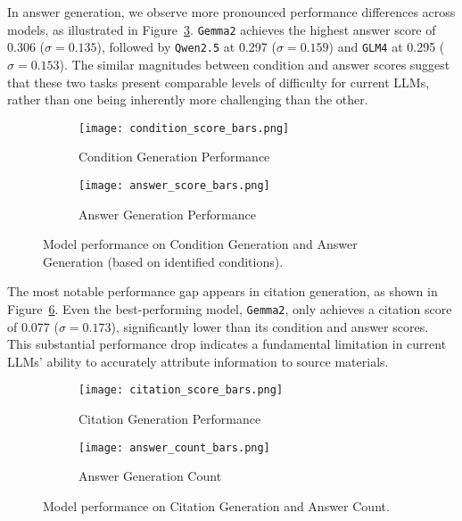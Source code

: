 In answer generation, we observe more pronounced performance differences across models, as illustrated in Figure~\ref{fig:performance-metrics-row1}. \texttt{Gemma2} achieves the highest answer score of 0.306 ($\sigma = 0.135$), followed by \texttt{Qwen2.5} at 0.297 ($\sigma = 0.159$) and \texttt{GLM4} at 0.295 ($\sigma = 0.153$). The similar magnitudes between condition and answer scores suggest that these two tasks present comparable levels of difficulty for current LLMs, rather than one being inherently more challenging than the other.

\begin{figure}[h]
    \centering
    \begin{subfigure}{0.48\textwidth}
        \texttt{[image: condition\_score\_bars.png]}
        \caption{Condition Generation Performance}
        \label{fig:condition-performance}
    \end{subfigure}
    \hfill
    \begin{subfigure}{0.48\textwidth}
        \texttt{[image: answer\_score\_bars.png]}
        \caption{Answer Generation Performance}
        \label{fig:answer-performance}
    \end{subfigure}
    \caption{Model performance on Condition Generation and Answer Generation (based on identified conditions).}
    \label{fig:performance-metrics-row1}
\end{figure}

The most notable performance gap appears in citation generation, as shown in Figure~\ref{fig:performance-metrics-row2}. Even the best-performing model, \texttt{Gemma2}, only achieves a citation score of 0.077 ($\sigma = 0.173$), significantly lower than its condition and answer scores. This substantial performance drop indicates a fundamental limitation in current LLMs' ability to accurately attribute information to source materials.

\begin{figure}[h]
    \centering
    \begin{subfigure}{0.48\textwidth}
        \texttt{[image: citation\_score\_bars.png]}
        \caption{Citation Generation Performance}
        \label{fig:citation-performance}
    \end{subfigure}
    \hfill
    \begin{subfigure}{0.48\textwidth}
        \texttt{[image: answer\_count\_bars.png]}
        \caption{Answer Generation Count}
        \label{fig:answer-count}
    \end{subfigure}
    \caption{Model performance on Citation Generation and Answer Count.}
    \label{fig:performance-metrics-row2}
\end{figure}

